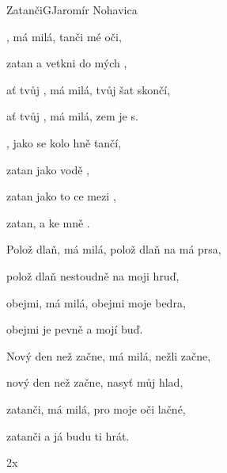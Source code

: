 \begin{song}{Zatanči}{G}{Jaromír Nohavica}

\begin{SBVerse}

, má milá, tanči  mé oči,

zatan a vetkni  do mých ,

ať tvůj , má milá,  tvůj šat  skončí,

ať tvůj , má milá, zem je s.

\end{SBVerse}

\begin{SBChorus}

, jako se kolo hně tančí,

zatan jako  vodě ,

zatan jako to ce mezi ,

zatan, a  ke mně .

\end{SBChorus}

\begin{SBVerse}

Polož dlaň, má milá, polož dlaň na má prsa,

polož dlaň nestoudně na moji hruď,

obejmi, má milá, obejmi moje bedra,

obejmi je pevně a mojí buď.

\end{SBVerse}

\begin{SBChorus}

\end{SBChorus}

\begin{SBVerse}

Nový den než začne, má milá, nežli začne,

nový den než začne, nasyť můj hlad,

zatanči, má milá, pro moje oči lačné,

zatanči a já budu ti hrát.

\end{SBVerse}

\begin{SBChorus}
2x
\end{SBChorus}

\end{song}

\clearpage

